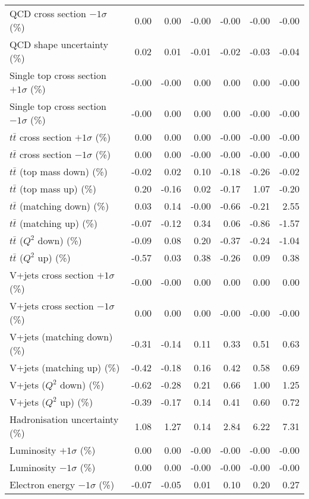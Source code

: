 \begin{table}[htbp]
{\begin{tabular}{lrrrrrr}
QCD cross section \ensuremath{-1\sigma} (\%) & 0.00 & 0.00 & -0.00 & -0.00 & -0.00 & -0.00 \\ 
QCD shape uncertainty (\%) & 0.02 & 0.01 & -0.01 & -0.02 & -0.03 & -0.04 \\ 
Single top cross section $+1\sigma$ (\%) & -0.00 & -0.00 & 0.00 & 0.00 & 0.00 & -0.00 \\ 
Single top cross section $-1\sigma$ (\%) & -0.00 & 0.00 & 0.00 & 0.00 & -0.00 & -0.00 \\ 
$t\bar{t}$ cross section $+1\sigma$ (\%) & 0.00 & 0.00 & 0.00 & -0.00 & -0.00 & -0.00 \\ 
$t\bar{t}$ cross section $-1\sigma$ (\%) & 0.00 & 0.00 & -0.00 & -0.00 & -0.00 & -0.00 \\ 
$t\bar{t}$ (top mass down) (\%) & -0.02 & 0.02 & 0.10 & -0.18 & -0.26 & -0.02 \\ 
$t\bar{t}$ (top mass up) (\%) & 0.20 & -0.16 & 0.02 & -0.17 & 1.07 & -0.20 \\ 
$t\bar{t}$ (matching down) (\%) & 0.03 & 0.14 & -0.00 & -0.66 & -0.21 & 2.55 \\ 
$t\bar{t}$ (matching up) (\%) & -0.07 & -0.12 & 0.34 & 0.06 & -0.86 & -1.57 \\ 
$t\bar{t}$ ($Q^{2}$ down) (\%) & -0.09 & 0.08 & 0.20 & -0.37 & -0.24 & -1.04 \\ 
$t\bar{t}$ ($Q^{2}$ up) (\%) & -0.57 & 0.03 & 0.38 & -0.26 & 0.09 & 0.38 \\ 
V+jets cross section \ensuremath{+1\sigma} (\%) & -0.00 & -0.00 & 0.00 & 0.00 & 0.00 & 0.00 \\ 
V+jets cross section \ensuremath{-1\sigma} (\%) & 0.00 & 0.00 & 0.00 & -0.00 & -0.00 & -0.00 \\ 
V+jets (matching down) (\%) & -0.31 & -0.14 & 0.11 & 0.33 & 0.51 & 0.63 \\ 
V+jets (matching up) (\%) & -0.42 & -0.18 & 0.16 & 0.42 & 0.58 & 0.69 \\ 
V+jets ($Q^{2}$ down) (\%) & -0.62 & -0.28 & 0.21 & 0.66 & 1.00 & 1.25 \\ 
V+jets ($Q^{2}$ up) (\%) & -0.39 & -0.17 & 0.14 & 0.41 & 0.60 & 0.72 \\ 
Hadronisation uncertainty (\%) & 1.08 & 1.27 & 0.14 & 2.84 & 6.22 & 7.31 \\ 
Luminosity $+1\sigma$ (\%) & 0.00 & 0.00 & -0.00 & -0.00 & -0.00 & -0.00 \\ 
Luminosity $-1\sigma$ (\%) & 0.00 & 0.00 & -0.00 & -0.00 & -0.00 & -0.00 \\ 
Electron energy $-1\sigma$ (\%) & -0.07 & -0.05 & 0.01 & 0.10 & 0.20 & 0.27 \\ 

\end{tabular}}
\end{table}

